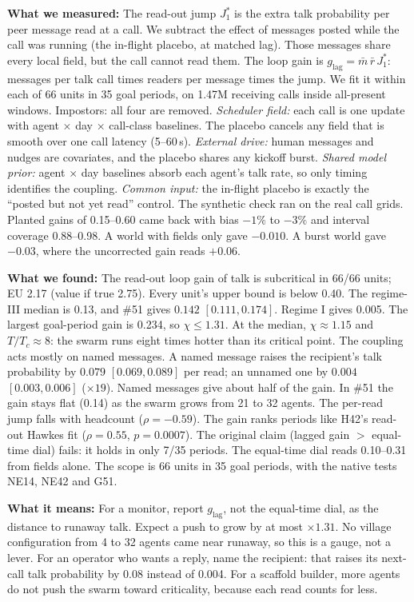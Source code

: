 \textbf{What we measured:} The read-out jump $J_1^*$ is the extra talk probability per peer message read at a call. We subtract the effect of messages posted while the call was running (the in-flight placebo, at matched lag). Those messages share every local field, but the call cannot read them. The loop gain is $g_\mathrm{lag}=\bar m\,\bar r\,J_1^*$: messages per talk call times readers per message times the jump. We fit it within each of 66 units in 35 goal periods, on 1.47M receiving calls inside all-present windows.
Impostors: all four are removed. \emph{Scheduler field:} each call is one update with agent $\times$ day $\times$ call-class baselines. The placebo cancels any field that is smooth over one call latency (5--60\,s). \emph{External drive:} human messages and nudges are covariates, and the placebo shares any kickoff burst. \emph{Shared model prior:} agent $\times$ day baselines absorb each agent's talk rate, so only timing identifies the coupling. \emph{Common input:} the in-flight placebo is exactly the ``posted but not yet read'' control.
The synthetic check ran on the real call grids. Planted gains of 0.15--0.60 came back with bias $-1\%$ to $-3\%$ and interval coverage 0.88--0.98. A world with fields only gave $-0.010$. A burst world gave $-0.03$, where the uncorrected gain reads $+0.06$.

\textbf{What we found:} The read-out loop gain of talk is subcritical in 66/66 units; EU 2.17 (value if true 2.75). Every unit's upper bound is below 0.40. The regime-III median is 0.13, and \#51 gives $0.142$ $[0.111, 0.174]$. Regime I gives 0.005. The largest goal-period gain is 0.234, so $\chi\le1.31$. At the median, $\chi\approx1.15$ and $T/T_c\approx8$: the swarm runs eight times hotter than its critical point. The coupling acts mostly on named messages. A named message raises the recipient's talk probability by $0.079$ $[0.069, 0.089]$ per read; an unnamed one by $0.004$ $[0.003, 0.006]$ ($\times19$). Named messages give about half of the gain. In \#51 the gain stays flat (0.14) as the swarm grows from 21 to 32 agents. The per-read jump falls with headcount ($\rho=-0.59$). The gain ranks periods like H42's read-out Hawkes fit ($\rho=0.55$, $p=0.0007$). The original claim (lagged gain $>$ equal-time dial) fails: it holds in only 7/35 periods. The equal-time dial reads 0.10--0.31 from fields alone.
The scope is 66 units in 35 goal periods, with the native tests NE14, NE42 and G51.

\textbf{What it means:} For a monitor, report $g_\mathrm{lag}$, not the equal-time dial, as the distance to runaway talk. Expect a push to grow by at most $\times1.31$. No village configuration from 4 to 32 agents came near runaway, so this is a gauge, not a lever. For an operator who wants a reply, name the recipient: that raises its next-call talk probability by 0.08 instead of 0.004. For a scaffold builder, more agents do not push the swarm toward criticality, because each read counts for less.

